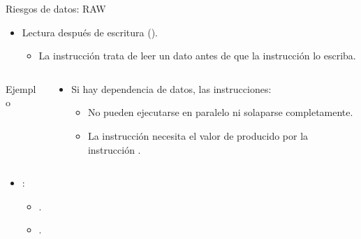 \begin{frame}[t,fragile]{Riesgos de datos: RAW}
\begin{itemize}
  \item Lectura después de escritura ().
    \begin{itemize}
      \item La instrucción  trata de leer un dato antes de que la
            instrucción  lo escriba.
    \end{itemize}
\end{itemize}
\begin{columns}
\begin{column}{.25\textwidth}
\begin{block}{Ejemplo}

\end{block}
\end{column}
\begin{column}{.75\textwidth}
\begin{itemize}
  \item Si hay dependencia de datos, las instrucciones:
    \begin{itemize}
      \item No pueden ejecutarse en paralelo ni solaparse completamente.
      \item La instrucción  necesita el valor de 
            producido por la instrucción .
    \end{itemize}
\end{itemize}
\end{column}
\end{columns}
\begin{itemize}
  \item {}:
  \begin{itemize}
    \item {}.
    \item {}.
  \end{itemize}
\end{itemize}
\end{frame}

